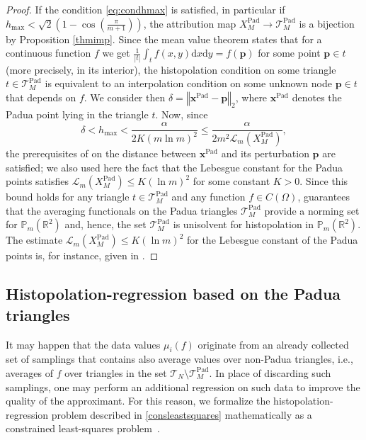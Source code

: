 \documentclass{svjour3}
\newcommand{\de}{\mathrm{d}}
\renewcommand{\P}{\mathbb{P}} %
\renewcommand{\de}{\mathrm{d}} %
\begin{document}
\begin{proof}
	If the condition \eqref{eq:condhmax} is satisfied, in particular if $ h_{\max} < \sqrt{2} \left( 1 - \cos \left( \frac{\pi}{m+1} \right) \right) $, the attribution map $ X_M^{\mathrm{Pad}} \to \mathcal{T}_M^{\mathrm{Pad}} $ is a bijection by Proposition \ref{thmimp}. Since the mean value theorem \cite[p. 126]{Zorich} states that for a continuous function $f$ we get $ \frac{1}{|t|} \int_{t} f(x,y) \de x \de y = f(\boldsymbol{p}) $ for some point $ \boldsymbol{p} \in t $ (more precisely, in its interior), the histopolation condition on some triangle $ t \in \mathcal{T}_M^{\mathrm{Pad}}$ is equivalent to an interpolation condition on some unknown node $\boldsymbol{p}  \in t$ that depends on $f$. We consider then $ \delta = \left\Vert \boldsymbol{x}^{\mathrm{Pad}} - \boldsymbol{p} \right\Vert_2 $, where $\boldsymbol{x}^{\mathrm{Pad}}$ denotes the Padua point lying in the triangle $t$. Now, since $$ \delta < h_{\max} < \frac{\alpha}{2 K \left(m \ln m\right)^2} \leq \frac{\alpha}{2 m^2 \mathscr{L}_m \left(X_M^{\mathrm{Pad}}\right)},$$ the prerequisites of \cite[Propostion 1]{PiazzonVianello} on the distance between $\boldsymbol{x}^{\mathrm{Pad}}$ and its perturbation $\boldsymbol{p}$ are satisfied; we also used here the fact that the Lebesgue constant for the Padua points satisfies $\mathscr{L}_m \left(X_M^{\mathrm{Pad}}\right) \leq K \left(\ln m\right)^2$ for some constant $K > 0$. Since this bound holds for any triangle $ t \in \mathcal{T}_M^{\mathrm{Pad}}$ and any function $f \in C(\Omega)$, \cite[Propostion 1]{PiazzonVianello} guarantees that the averaging functionals on the Padua triangles $ \mathcal{T}_M^{\mathrm{Pad}} $ provide a norming set for $ \P_m\left(\mathbb{R}^2\right) $ and, hence, the set $ \mathcal{T}_M^{\mathrm{Pad}}$ is unisolvent for histopolation in $ \P_m \left(\mathbb{R}^2\right) $. The estimate $\mathscr{L}_m \left(X_M^{\mathrm{Pad}}\right) \leq K \left(\ln m\right)^2 $ for the Lebesgue constant of the Padua points is, for instance, given in \cite{Bos;2006:BLI}. 
\end{proof}



\subsection{Histopolation-regression based on the Padua triangles} \label{sect:regressionmethod}

It may happen that the data values $\mu_i(f)$ originate from an already collected set of samplings that contains also average values over non-Padua triangles, i.e., averages of $f$ over triangles in the set $ \mathcal{T}_N \setminus \mathcal{T}_M^{\mathrm{Pad}} $. In place of discarding such samplings, one may perform an additional regression on such data to improve the quality of the approximant. For this reason, we formalize the histopolation-regression problem described in \eqref{consleastsquares} mathematically as a constrained least-squares problem~\cite{DellAccio:2022:GOT,dell2024extension,de2024mixed}.  
\end{document}
